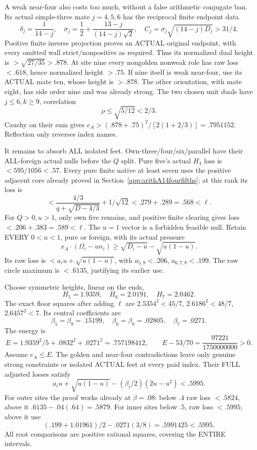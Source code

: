 \documentclass[11pt]{article}
\begin{document}
A weak near-four also costs too much, without
a false arithmetic conjugate ban.
Its actual simple-three mate \(j=4,5,6\) has
the reciprocal finite endpoint data
\[
 \delta_j={\frac{1}{14-j}},\quad
 \sigma_j={\frac{1}{2}}+{\frac{13-j}{(14-j)\sqrt2}},\quad
 C_j=\sigma_j\sqrt{(14-j)D_j}>31/4 .
\]
Positive finite inverse projection proves an
ACTUAL original endpoint, with every omitted
wall strict/nonpositive as required.
Thus its normalized dual height is
\(>\sqrt{27/35}>.878\).
At site nine every nongolden nonweak role has
raw loss \(<.618\), hence normalized height
\(>.75\).
If nine itself is weak near-four, use its
ACTUAL mate ten, whose height is \(>.878\).
The other orientation, with mate eight, has
side order nine and was already strong.
The two chosen unit duals have \(j\le6,k\ge9\),
correlation
\[
                         \rho\le\sqrt{5/12}<2/3 .
\]
Cauchy on their sum gives
\(e_A>(.878+.75)^2/[2(1+2/3)]=.7951152\).
Reflection only reverses index names.

It remains to absorb ALL isolated feet.
Own-three/four/six/parallel have their ALL-foreign
actual nulls before the \(Q\) split.
Pure five's actual \(H_4\) loss is
\(<595/1056<.57\).
Every pure finite native at least seven uses
the positive adjacent core already proved in
Section~\ref{app:arithA14fourfifths};
at this rank its loss is
\[
        <{\frac{4/3}{q+\sqrt{D-4/3}}}+1/\sqrt{12}
                       <.279+.289=.568<\ell .
\]
For \(Q>0,u>1\), only own five remains,
and positive finite clearing gives loss
\(<.206+.383=.589<\ell\).
The \(u=1\) vector is a forbidden feasible null.
Retain EVERY \(0<u<1\), pure or foreign,
with its actual pressure
\[
 x_A\cdot(\Omega_i-un_i)\ge
                      \sqrt{D_i-u}-\sqrt{u(1-u)}.
\]
Its raw loss is
\(<a_i u+\sqrt{u(1-u)}\),
with \(a_{5,9}<.206\), \(a_{6,7,8}<.199\).
The raw circle maximum is \(<.6135\),
justifying its earlier use.

Choose symmetric heights, linear on the ends,
\[
                         H_5=1.9359,\quad H_6=2.0191,\quad H_7=2.0462.
\]
The exact floor squares after adding \(\ell\) are
\(2.5354^2<45/7\), \(2.6186^2<48/7\),
\(2.6457^2<7\).
Its central coefficients are
\[
                    \beta_5=\beta_9=.15199,\quad
                    \beta_6=\beta_8=.02805,\quad\beta_7=.0271 .
\]
The energy is
\[
 E=1.9359^2/5+.0832^2+.0271^2=.757198412,\qquad
 E-53/70={\frac{97221}{1750000000}}>0 .
\]
Assume \(e_A\le E\).
The golden and near-four contradictions leave
only genuine strong constraints or isolated
ACTUAL feet at every paid index.
Their FULL adjusted losses satisfy
\[
               a_i u+\sqrt{u(1-u)}
                          -(\beta_i/2)(2u-u^2)<.5995 .
\]
For outer sites the proof works already at
\(\beta=.08\):
below \(.4\) raw loss \(<.5824\), above it
\(.6135-.04(.64)=.5879\).
For inner sites below \(.5\), raw loss \(<.5995\);
above it use
\[
              (.199+1.01961)/2-.0271(3/8)
                                   =.5991425<.5995 .
\]
All root comparisons are positive rational
squares, covering the ENTIRE intervals.
\end{document}

